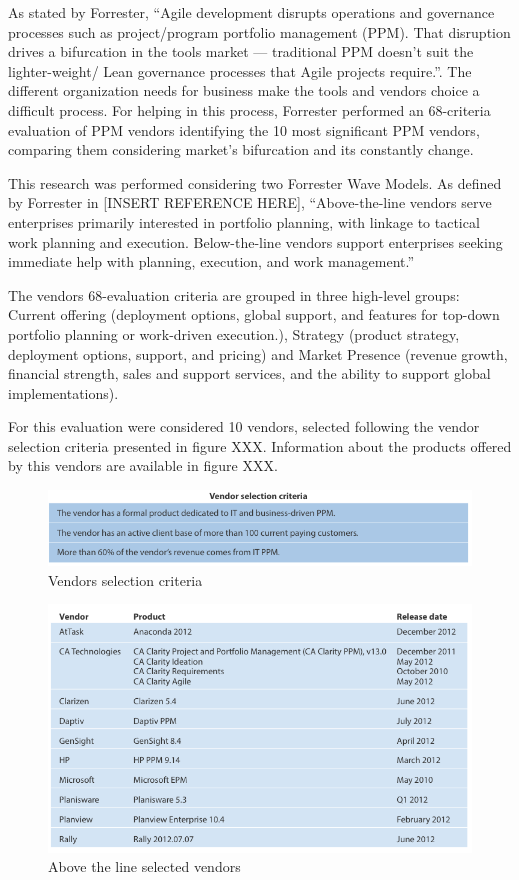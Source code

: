 As stated by Forrester, ``Agile development disrupts operations and governance processes such as project/program portfolio management (PPM). That disruption drives a bifurcation in the tools market — traditional PPM doesn’t suit the lighter-weight/ Lean governance processes that Agile projects require.''. The different organization needs for business make the tools and vendors choice a difficult process. For helping in this process, Forrester performed an 68-criteria evaluation of PPM vendors identifying the 10 most significant PPM vendors, comparing them  considering market’s bifurcation and its constantly change.\par
This research was performed considering two Forrester Wave Models. As defined by Forrester in [INSERT REFERENCE HERE], ``Above-the-line vendors serve enterprises primarily interested in portfolio planning, with linkage to tactical work planning and execution. Below-the-line vendors support enterprises seeking immediate help with planning, execution, and work management.''\par
The vendors 68-evaluation criteria are grouped in three high-level groups: Current offering (deployment options, global support, and features for top-down portfolio planning or work-driven execution.), Strategy (product strategy, deployment options, support, and pricing) and Market Presence (revenue growth, financial strength, sales and support services, and the ability to support global implementations).\par
For this evaluation were considered 10 vendors, selected following the vendor selection criteria presented in figure XXX. Information about the products offered by this vendors are available in figure XXX.\par

\begin{figure}
\centering
\includegraphics{img/AboveLineCriteria.png}
\caption{Vendors selection criteria}
\end{figure}


\begin{figure}
\centering
\includegraphics{img/AboveLineVendors.png}
\caption{Above the line selected vendors}
\end{figure}

